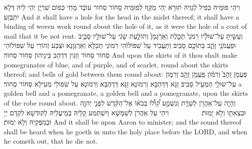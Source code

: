 {{}
{וִיהֵי פוּמֵּיהּ כְּפִיל לְגַוֵּיהּ תּוּרָא יְהֵי מַקַּף לְפוּמֵּיהּ סְחוֹר סְחוֹר עוֹבָד מָחֵי כְּפוֹם שִׁרְיָן יְהֵי לֵיהּ דְּלָא יִתְבְּזַע׃}
{And it shall have a hole for the head in the midst thereof; it shall have a binding of woven work round about the hole of it, as it were the hole of a coat of mail that it be not rent.}{}
{וְעָשִׂ֣יתָ עַל־שׁוּלָ֗יו רִמֹּנֵי֙ תְּכֵ֤לֶת וְאַרְגָּמָן֙ וְתוֹלַ֣עַת שָׁנִ֔י עַל־שׁוּלָ֖יו סָבִ֑יב וּפַעֲמֹנֵ֥י זָהָ֛ב בְּתוֹכָ֖ם סָבִֽיב׃
}
{וְתַעֲבֵיד עַל שִׁפּוֹלוֹהִי רִמּוֹנֵי תַּכְלָא וְאַרְגְּוָנָא וּצְבַע זְהוֹרִי עַל שִׁפּוֹלוֹהִי סְחוֹר סְחוֹר וְזַגִּין דִּדְהַב בֵּינֵיהוֹן סְחוֹר סְחוֹר׃}
{And upon the skirts of it thou shalt make pomegranates of blue, and of purple, and of scarlet, round about the skirts thereof; and bells of gold between them round about:}{}
{פַּעֲמֹ֤ן זָהָב֙ וְרִמּ֔וֹן פַּֽעֲמֹ֥ן זָהָ֖ב וְרִמּ֑וֹן עַל־שׁוּלֵ֥י הַמְּעִ֖יל סָבִֽיב׃
}
{זַגָּא דְּדַהְבָּא וְרִמּוֹנָא זַגָּא דְּדַהְבָּא וְרִמּוֹנָא עַל שִׁפּוֹלֵי מְעִילָא סְחוֹר סְחוֹר׃}
{a golden bell and a pomegranate, a golden bell and a pomegranate, upon the skirts of the robe round about.}{}
{וְהָיָ֥ה עַֽל־אַהֲרֹ֖ן לְשָׁרֵ֑ת וְנִשְׁמַ֣ע ק֠וֹל֠וֹ בְּבֹא֨וֹ אֶל־הַקֹּ֜דֶשׁ לִפְנֵ֧י יְהֹוָ֛ה וּבְצֵאת֖וֹ וְלֹ֥א יָמֽוּת׃ \setuma         
}
{וִיהֵי עַל אַהֲרֹן לְשַׁמָּשָׁא וְיִשְׁתְּמַע קָלֵיהּ בְּמֵיעֲלֵיהּ לְקוּדְשָׁא לִקְדָם יְיָ וּבְמִפְּקֵיהּ וְלָא יְמוּת׃}
{And it shall be upon Aaron to minister; and the sound thereof shall be heard when he goeth in unto the holy place before the LORD, and when he cometh out, that he die not.}{}
}
